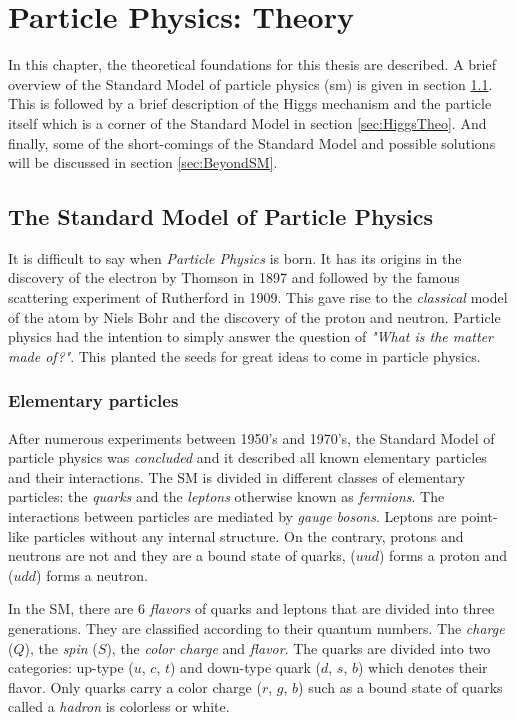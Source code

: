 \chapter{Particle Physics: Theory}
\label{chap:Theory}

In this chapter, the theoretical foundations for this thesis are described. A brief overview of the Standard Model of particle physics (\acrshort{sm}) is given in section \ref{sec:SM}. This is followed by a brief description of the Higgs mechanism and the particle itself which is a corner of the Standard Model in section \ref{sec:HiggsTheo}. And finally, some of the short-comings of the Standard Model and possible solutions will be discussed in section \ref{sec:BeyondSM}.

\section{The Standard Model of Particle Physics}
\label{sec:SM}

It is difficult to say when \textit{Particle Physics} is born. It has its origins in the discovery of the electron by Thomson \cite{JJThomson:1897} in 1897 and followed by the famous scattering experiment of Rutherford \cite{Rutherford:1911} in 1909. This gave rise to the \textit{classical} model of the atom by Niels Bohr and the discovery of the proton and neutron. Particle physics had the intention to simply answer the question of \textit{"What is the matter made of?"}. This planted the seeds for great ideas to come in particle physics.

\subsection{Elementary particles}

After numerous experiments between 1950's and 1970's, the Standard Model of particle physics was \textit{concluded} and it described all known elementary particles and their interactions. The SM is divided in different classes of elementary particles: the \textit{quarks} and the \textit{leptons} otherwise known as \textit{fermions}. The interactions between particles are mediated by \textit{gauge bosons}. Leptons are point-like particles without any internal structure. On the contrary, protons and neutrons are not and they are a bound state of quarks, ($uud$) forms a proton and ($udd$) forms a neutron.

In the SM, there are 6 \textit{flavors} of quarks and leptons that are divided into three generations. They are classified according to their quantum numbers. The \textit{charge} ($Q$), the \textit{spin} ($S$), the \textit{color charge} and \textit{flavor}. The quarks are divided into two categories: up-type ($u$, $c$, $t$) and down-type quark ($d$, $s$, $b$) which denotes their flavor. Only quarks carry a color charge ($r$, $g$, $b$) such as a bound state of quarks called a \textit{hadron} is colorless or white.

